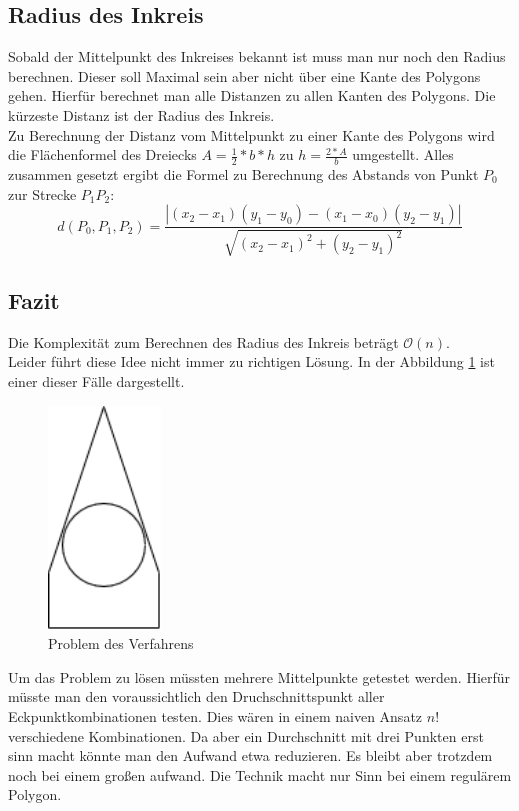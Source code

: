 \documentclass[conference]{IEEEtran}
\begin{document}
	\subsection{Radius des Inkreis}
	Sobald der Mittelpunkt des Inkreises bekannt ist muss man nur noch den Radius berechnen. Dieser soll Maximal sein aber nicht über eine Kante des Polygons gehen. Hierfür berechnet man alle Distanzen zu allen Kanten des Polygons. Die kürzeste Distanz ist der Radius des Inkreis.\\
	Zu Berechnung der Distanz vom Mittelpunkt zu einer Kante des Polygons wird die Flächenformel des Dreiecks $A = \frac{1}{2}*b*h$ zu $h=\frac{2*A}{b}$ umgestellt. 
	Alles zusammen gesetzt ergibt die Formel zu Berechnung des Abstands von Punkt $P_0$ zur Strecke $P_1P_2$:
	\[ d(P_0,P_1,P_2) = \frac{|(x_2-x_1)(y_1-y_0) - (x_1-x_0)(y_2-y_1)|}{\sqrt{(x_2-x_1)^2+(y_2-y_1)^2}} \]
	\subsection{Fazit}
	Die Komplexität zum Berechnen des Radius des Inkreis beträgt $\mathcal{O}(n)$.\\
	Leider führt diese Idee nicht immer zu richtigen Lösung. In der Abbildung \ref{fail} ist einer dieser Fälle dargestellt.\\
	\begin{figure}[h]
		\begin{center}
			\includegraphics[width=3cm]{CircleFail.png}
			\caption{Problem des Verfahrens}
			\label{fail}
		\end{center}
	\end{figure}
	Um das Problem zu lösen müssten mehrere Mittelpunkte getestet werden. Hierfür müsste man den voraussichtlich den Druchschnittspunkt aller Eckpunktkombinationen testen. Dies wären in einem naiven Ansatz $n!$ verschiedene Kombinationen. Da aber ein Durchschnitt mit drei Punkten erst sinn macht könnte man den Aufwand etwa reduzieren. Es bleibt aber trotzdem noch bei einem großen aufwand. Die Technik macht nur Sinn bei einem regulärem Polygon.
	
\end{document}
